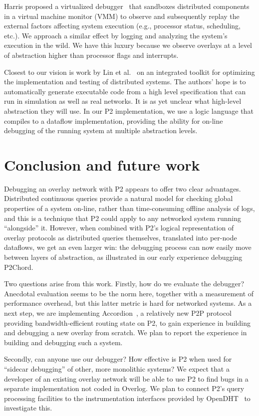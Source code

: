 \documentclass[10pt,twocolumn]{article}
\def\Sys{P2\xspace}
\begin{document}
Harris proposed a virtualized debugger~\cite{harris-EW02} that sandboxes
distributed components in a virtual machine monitor (VMM) to observe and
subsequently replay the external factors affecting system execution
(e.g., processor status, scheduling, etc.). We approach a similar effect
by logging and analyzing the system's execution in the wild.  We
have this luxury because we observe overlays at a level of abstraction
higher than processor flags and interrupts.

Closest to our vision is work by Lin et al.~\cite{wids-hotos05} on an
integrated toolkit for optimizing the implementation and testing of
distributed systems. The authors' hope is to automatically generate
executable code from a high level specification that can run in
simulation as well as real networks.  It is as yet unclear what
high-level abstraction they will use.  In our \Sys implementation, we
use a logic language that compiles to a dataflow implementation,
providing the ability for on-line debugging of the running system at
multiple abstraction levels.



\section{Conclusion and future work}
\label{sec:conclusion}

Debugging an overlay network with P2 appears to offer two clear
advantages. Distributed continuous queries provide a natural
model for checking global properties of a system on-line, rather than
time-consuming offline analysis of logs, and this is a technique that
P2 could apply to any networked system running ``alongside'' it.
However, when combined with P2's logical representation of overlay
protocols as distributed queries themselves, translated into per-node
dataflows, we get an even larger win: the debugging process can now
easily move between layers of abstraction, as illustrated in our early
experience debugging P2Chord. 

Two questions arise from this work.  Firstly, how do we evaluate the
debugger?  Anecdotal evaluation seems to be the norm here, together with
a measurement of performance overhead, but this latter metric is hard
for networked systems.  As a next step, we are implementing
Accordion~\cite{Li2005}, a relatively new P2P protocol providing
bandwidth-efficient routing state on \Sys, to gain experience in
building and debugging a new overlay from scratch.  We plan to report
the experience in building and debugging such a system.

Secondly, can anyone use our debugger?  How effective is P2 when used
for ``sidecar debugging'' of other, more monolithic systems?  We expect
that a developer of an existing overlay network will be able to use P2
to find bugs in a separate implementation not coded in Overlog.  We plan
to connect P2's query processing facilities to the instrumentation
interfaces provided by OpenDHT~\cite{Rhea2005} to investigate this.

{\footnotesize

}
\end{document}
